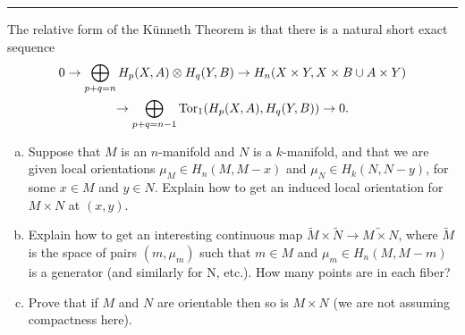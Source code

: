 \documentclass[letterpaper, 12pt]{article}
\begin{document}
\noindent\rule{7in}{2.8pt}
\newpage 
\begin{problem}{5}
The relative form of the Künneth Theorem is that there is a natural short exact sequence 
\begin{multline*}
    0\rightarrow \bigoplus_{p+q=n}H_p(X,A)\otimes H_q(Y,B)\rightarrow H_n(X\times Y, X\times B\cup A\times Y)\\
    \rightarrow \bigoplus_{p+q=n-1}\text{Tor}_1(H_p(X,A),H_q(Y,B))\rightarrow 0.
\end{multline*}

\begin{enumerate}[(a)]
\item Suppose that \(M\) is an \(n\)-manifold and \(N\) is a \(k\)-manifold, and that we are given local orientations \(\mu_M\in H_n(M,M-x)\) and \(\mu_N\in H_k(N,N-y)\), for some \(x\in M\) and \(y\in N\). Explain how to get an induced local orientation for \(M\times N\) at \((x,y)\).
\item Explain how to get an interesting continuous map \(\tilde{M}\times \tilde{N}\rightarrow \widetilde{M\times N}\), where \(\tilde{M}\) is the space of pairs \((m,\mu_m)\) such that \(m\in M\) and \(\mu_m\in H_n(M,M-m)\) is a generator (and similarly for N, etc.). How many points are in each fiber?
\item Prove that if \(M\) and \(N\) are orientable then so is \(M\times N\) (we are not assuming compactness here). 
\end{enumerate}
\end{problem}
\end{document}
